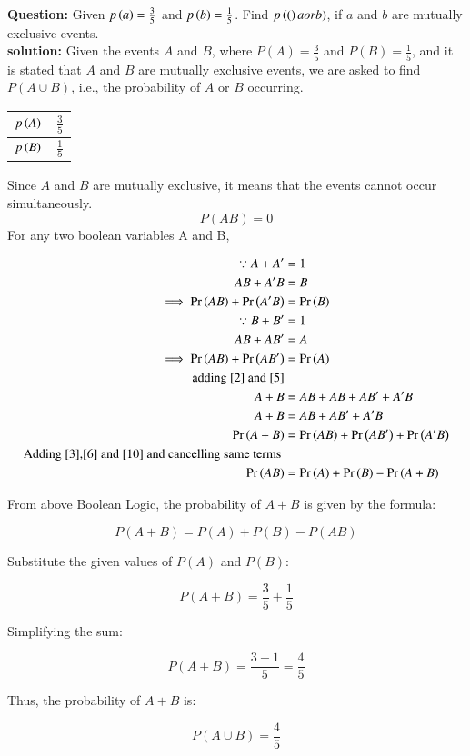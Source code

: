 \documentclass[journal]{IEEEtran}
\begin{document}
\textbf{Question:}
Given $p\left(a\right)=\frac{3}{5}$ and $p\left(b\right)=\frac{1}{5}$. Find $p\left((\right)a or b)$, if $a$ and $b$ are mutually exclusive events.\\
\textbf{solution:}
Given the events \( A \) and \( B \), where \( P(A) = \frac{3}{5} \) and \( P(B) = \frac{1}{5} \), and it is stated that \( A \) and \( B \) are mutually exclusive events, we are asked to find \( P(A \cup B) \), i.e., the probability of \( A \) or \( B \) occurring.\\
\begin{center}
\begin{tabular}{|c|c|}
    \hline
    $p\left(A\right)$ & $\frac{3}{5}$ \\
    \hline
    $p\left(B\right)$ & $\frac{1}{5}$\\
    \hline
\end{tabular}
\end{center}
Since \( A \) and \( B \) are mutually exclusive, it means that the events cannot occur simultaneously.\\
\[
P(AB)=0
\]
 For any two boolean variables A and B,
\begin{center}
\begin{align}
	\because A + A^\prime &= 1 \\
	 AB + A^\prime B &= B \label{2} \\
	 \implies \Pr\left(AB\right) + \Pr\left(A^\prime B\right) &= \Pr\left(B\right) \label{3} \\
	 \because B + B^\prime &= 1 \\
	 AB + AB^\prime &= A \label{5}\\
	 \implies \Pr\left(AB\right) + \Pr\left(AB^\prime\right) &= \Pr\left(A\right) \label{6} \\
	 \text{adding } \eqref{2} \text{ and } \eqref{5} \\
	 A + B &= AB + AB + AB^\prime + A^\prime B  \\
	 A + B &= AB + AB^\prime + A^\prime B \\ 
	 \Pr\left(A + B\right) &= \Pr\left(AB\right) + \Pr\left(AB^\prime\right) + \Pr\left(A^\prime B\right) \label{10}\\
	 \text{Adding \eqref{3},\eqref{6} and \eqref{10} and cancelling same terms } \\
	 \Pr\left(AB\right) &= \Pr\left(A\right) + \Pr\left(B\right) - \Pr\left(A + B\right)
\end{align}
\end{center}
From above Boolean Logic, the probability of \( A + B \) is given by the formula:

\[
P(A+B) = P(A) + P(B) - P(AB)
\]

Substitute the given values of \( P(A) \) and \( P(B) \):

\[
P(A + B) = \frac{3}{5} + \frac{1}{5}
\]

Simplifying the sum:

\[
P(A + B) = \frac{3 + 1}{5} = \frac{4}{5}
\]

Thus, the probability of \( A + B \) is:

\[
P(A \cup B) = \frac{4}{5}
\]
\end{document}
